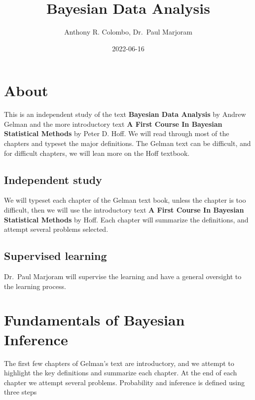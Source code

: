 \documentclass[
]{book}
\title{Bayesian Data Analysis}
\author{Anthony R. Colombo, Dr.~Paul Marjoram}
\date{2022-06-16}
\theoremstyle{definition}
\theoremstyle{definition}
\theoremstyle{definition}
\theoremstyle{definition}
\theoremstyle{remark}
\begin{document}
\maketitle

{
\setcounter{tocdepth}{1}
\tableofcontents
}
\hypertarget{about}{%
\chapter*{About}\label{about}}

This is an independent study of the text \textbf{Bayesian Data Analysis} by Andrew Gelman and the more introductory text \textbf{A First Course In Bayesian Statistical Methods} by Peter D. Hoff. We will read through most of the chapters and typeset the major definitions. The Gelman text can be difficult, and for difficult chapters, we will lean more on the Hoff textbook.

\hypertarget{independent-study}{%
\section*{Independent study}\label{independent-study}}

We will typeset each chapter of the Gelman text book, unless the chapter is too difficult, then we will use the introductory text \textbf{A First Course In Bayesian Statistical Methods} by Hoff. Each chapter will summarize the definitions, and attempt several problems selected.

\hypertarget{supervised-learning}{%
\section*{Supervised learning}\label{supervised-learning}}

Dr.~Paul Marjoram will supervise the learning and have a general oversight to the learning process.

\hypertarget{fundamentals-of-bayesian-inference}{%
\chapter{Fundamentals of Bayesian Inference}\label{fundamentals-of-bayesian-inference}}

The first few chapters of Gelman's text are introductory, and we attempt to highlight the key definitions and summarize each chapter. At the end of each chapter we attempt several problems. Probability and inference is defined using three steps
\end{document}
